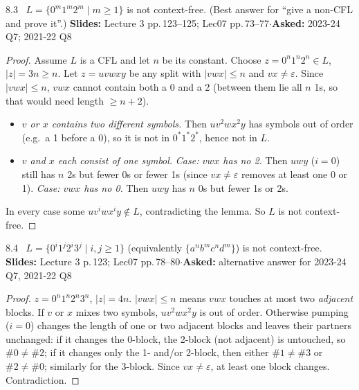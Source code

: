 \documentclass[10.5pt,a4paper]{article}
\newcommand{\src}[2]{{\footnotesize\color{gray!70!black}\textbf{Slides:} #1\enspace$\cdot$\enspace\textbf{Asked:} #2}\par}
\newcommand{\eps}{\varepsilon}
\begin{document}
\begin{thm}{8.3 \ $L=\{0^m1^m2^m\mid m\ge1\}$ is not context-free. (Best answer for ``give a non-CFL and prove it''.)}
\src{Lecture 3 pp.\,123--125; Lec07 pp.\,73--77}{2023-24 Q7; 2021-22 Q8}\end{thm}
\begin{proof}
Assume $L$ is a CFL and let $n$ be its constant. Choose $z=0^n1^n2^n\in L$, $|z|=3n\ge n$. Let $z=uvwxy$ be any split with $|vwx|\le n$ and
$vx\ne\eps$. Since $|vwx|\le n$, $vwx$ cannot contain both a 0 and a 2 (between them lie all $n$ 1s, so that would need length $\ge n+2$).
\begin{itemize}
\item \emph{$v$ or $x$ contains two different symbols.} Then $uv^2wx^2y$ has symbols out of order (e.g.\ a 1 before a 0), so it is not
in $0^*1^*2^*$, hence not in $L$.
\item \emph{$v$ and $x$ each consist of one symbol.} \emph{Case: $vwx$ has no 2.} Then $uwy$ ($i=0$) still has $n$ 2s but fewer 0s or fewer
1s (since $vx\ne\eps$ removes at least one 0 or 1). \emph{Case: $vwx$ has no 0.} Then $uwy$ has $n$ 0s but fewer 1s or 2s.
\end{itemize}
In every case some $uv^iwx^iy\notin L$, contradicting the lemma. So $L$ is not context-free.
\end{proof}

\begin{thm}{8.4 \ $L=\{0^i1^j2^i3^j\mid i,j\ge1\}$ (equivalently $\{a^nb^mc^nd^m\}$) is not context-free.}
\src{Lecture 3 p.\,123; Lec07 pp.\,78--80}{alternative answer for 2023-24 Q7, 2021-22 Q8}\end{thm}
\begin{proof}
$z=0^n1^n2^n3^n$, $|z|=4n$. $|vwx|\le n$ means $vwx$ touches at most two \emph{adjacent} blocks. If $v$ or $x$ mixes two symbols, $uv^2wx^2y$ is
out of order. Otherwise pumping ($i=0$) changes the length of one or two adjacent blocks and leaves their partners unchanged: if it changes
the 0-block, the 2-block (not adjacent) is untouched, so $\#0\ne\#2$; if it changes only the 1- and/or 2-block, then either $\#1\ne\#3$ or
$\#2\ne\#0$; similarly for the 3-block. Since $vx\ne\eps$, at least one block changes. Contradiction.
\end{proof}
\end{document}
